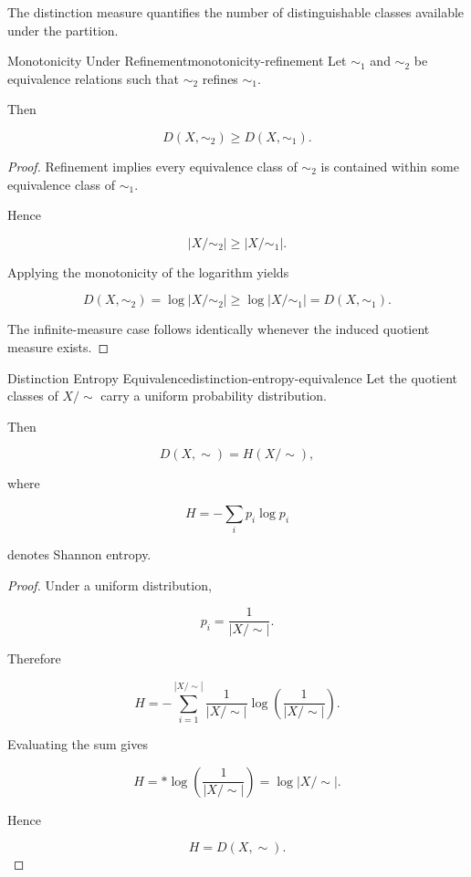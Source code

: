 \documentclass[12pt,twoside,openright]{book}
\begin{document}
The distinction measure quantifies the number of distinguishable classes available under the partition.

\begin{proposition}{Monotonicity Under Refinement}{monotonicity-refinement}
Let $\sim_1$ and $\sim_2$ be equivalence relations such that
$\sim_2$ refines $\sim_1$.

Then

\[
D(X,\sim_2)
\ge
D(X,\sim_1).
\]
\end{proposition}

\begin{proof}
Refinement implies every equivalence class of
$\sim_2$ is contained within some equivalence class of
$\sim_1$.

Hence

\[
|X/{\sim_2}|
\ge
|X/{\sim_1}|.
\]

Applying the monotonicity of the logarithm yields

\[
D(X,\sim_2)
=

\log|X/{\sim_2}|
\ge
\log|X/{\sim_1}|
=

D(X,\sim_1).
\]

The infinite-measure case follows identically whenever the induced quotient measure exists.
\end{proof}

\begin{theorem}{Distinction Entropy Equivalence}{distinction-entropy-equivalence}
Let the quotient classes of
$X/{\sim}$ carry a uniform probability distribution.

Then

\[
D(X,\sim)
=

H(X/{\sim}),
\]

where

\[
H
=

-\sum_i p_i\log p_i
\]

denotes Shannon entropy.
\end{theorem}

\begin{proof}
Under a uniform distribution,

\[
p_i
=

\frac1{|X/{\sim}|}.
\]

Therefore

\[
H
=

-\sum_{i=1}^{|X/{\sim}|}
\frac1{|X/{\sim}|}
\log
\left(
\frac1{|X/{\sim}|}
\right).
\]

Evaluating the sum gives

\[
H
=

*

\log
\left(
\frac1{|X/{\sim}|}
\right)
=

\log|X/{\sim}|.
\]

Hence

\[
H
=

D(X,\sim).
\]
\end{proof}
\end{document}
